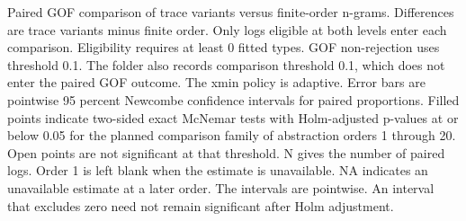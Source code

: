 Paired GOF comparison of trace variants versus finite-order n-grams. Differences are trace variants minus finite order. Only logs eligible at both levels enter each comparison. Eligibility requires at least 0 fitted types. GOF non-rejection uses threshold 0.1. The folder also records comparison threshold 0.1, which does not enter the paired GOF outcome. The xmin policy is adaptive. Error bars are pointwise 95 percent Newcombe confidence intervals for paired proportions. Filled points indicate two-sided exact McNemar tests with Holm-adjusted p-values at or below 0.05 for the planned comparison family of abstraction orders 1 through 20. Open points are not significant at that threshold. N gives the number of paired logs. Order 1 is left blank when the estimate is unavailable. NA indicates an unavailable estimate at a later order. The intervals are pointwise. An interval that excludes zero need not remain significant after Holm adjustment.
